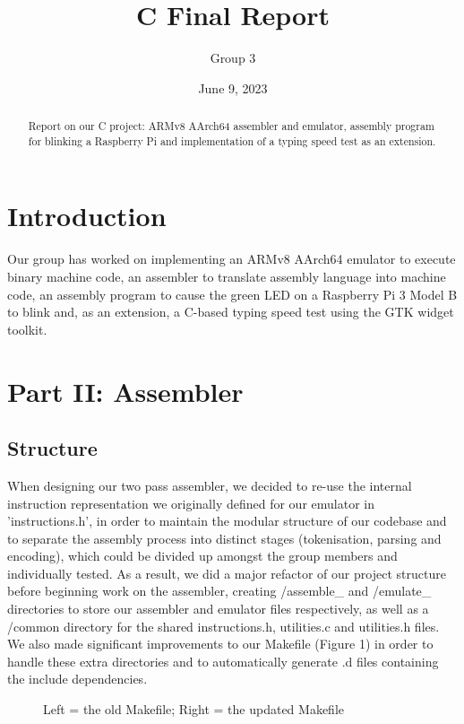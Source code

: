 \documentclass{article}
\date{June 9, 2023}
\title{C Final Report}
\author{Group 3}
\begin{document}
\maketitle

\begin{abstract}
\centering
Report on our C project: ARMv8 AArch64 assembler and emulator, assembly program for blinking a Raspberry Pi and implementation of a typing speed test as an extension.
\end{abstract}

\section{Introduction}

Our group has worked on implementing an ARMv8 AArch64 emulator to execute binary machine code, an assembler to translate assembly language into machine code, an assembly program to cause the green LED on a Raspberry Pi 3 Model B to blink and, as an extension, a C-based typing speed test using the GTK widget toolkit.

\section{Part II: Assembler}

\subsection{Structure}

When designing our two pass assembler, we decided to re-use the internal instruction representation we originally defined for our emulator in 'instructions.h', in order to maintain the modular structure of our codebase and to separate the assembly process into distinct stages (tokenisation, parsing and encoding), which could be divided up amongst the group members and individually tested. As a result, we did a major refactor of our project structure before beginning work on the assembler, creating /assemble\_ and /emulate\_  directories to store our assembler and emulator files respectively, as well as a /common directory for the shared instructions.h, utilities.c and utilities.h files. We also made significant improvements to our Makefile (Figure 1) in order to handle these extra directories and to automatically generate .d files containing the include dependencies.

\begin{figure}
\begin{minipage}{.4\textwidth}
\end{minipage}
\hfill    
\begin{minipage}{.4\textwidth}
\end{minipage}
    \caption{Left = the old Makefile; Right = the updated Makefile}
\end{figure}
\end{document}
